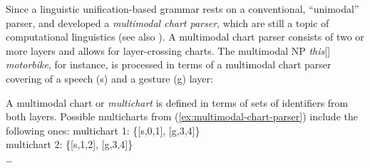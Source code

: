\documentclass[output=paper]{langsci/langscibook}
\begin{document}
Since a linguistic unification-based grammar rests on a conventional, \enquote{unimodal} parser, \citet{Johnston:1998} and \citet{Johnston:et:al:1997} developed a \emph{multimodal chart parser}, which are still a topic of computational linguistics \citep{Alahverdzhieva:Flickinger:Lascarides:2012} (see also ).
%
A multimodal chart parser consists of two or more layers and allows for layer-crossing charts.
%
The multimodal NP \emph{this}[\Pointing] \emph{motorbike}, for instance, is processed in terms of a multimodal chart parser covering of a speech (s) and a gesture (g) layer:
%
\ea \label{ex:multimodal-chart-parser}
\z

A multimodal chart or \emph{multichart}  is defined in terms of sets of identifiers from both layers.
%
Possible multicharts from (\ref{ex:multimodal-chart-parser}) include the following ones:
%
\ea
multichart 1: \{[s,0,1], [g,3,4]\} \\
multichart 2: \{[s,1,2], [g,3,4]\} \\
\ldots
\z
{}

\end{document}
